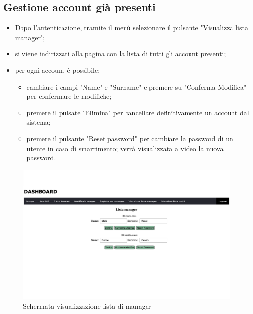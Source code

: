 \subsection{Gestione account già presenti}
\begin{itemize}
    \item Dopo l'autenticazione, tramite il menù selezionare il pulsante "Visualizza lista manager";
    \item si viene indirizzati alla pagina con la lista di tutti gli account presenti;
    \item per ogni account è possibile:
        \begin{itemize}
            \item cambiare i campi "Name" e "Surname" e premere su "Conferma Modifica" per confermare le modifiche;
            \item premere il pulsate "Elimina" per cancellare definitivamente un account dal sistema;
            \item premere il pulsante "Reset password" per cambiare la password di un utente in caso di smarrimento; verrà visualizzata a video la nuova password.
        \end{itemize}
\end{itemize}

\begin{figure}[H]
    \centering
    \includegraphics[scale=0.12]{res/images/listmanager_admin.png}
    \caption{Schermata visualizzazione lista di manager}
\end{figure}

